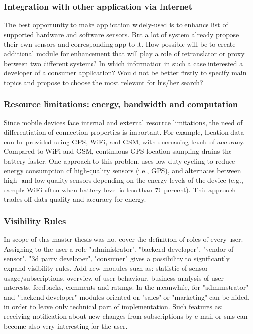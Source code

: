 		\subsubsection {Integration with other application via Internet}
		 The best opportunity to make application widely-used is to enhance list of supported hardware and software sensors. But a lot of system already propose their own sensors and corresponding app to it. How possible will be to create additional module for enhancement that will play a role of retranslator or proxy between two different systems? In which information in such a case interested a developer of a consumer application? Would not be better firstly to specify main topics and propose to choose the most relevant for his/her search?

		\subsubsection {Resource limitations: energy, bandwidth and computation}
		Since mobile devices face internal and external resource limitations, the need of differentiation of connection properties is important. For example, location data can be provided using GPS, WiFi, and GSM, with decreasing levels of accuracy. Compared to WiFi and GSM, continuous GPS location sampling drains the battery faster. One approach to this problem uses low duty cycling to reduce energy consumption of high-quality sensors (i.e., GPS), and alternates between high- and low-quality sensors depending on the energy levels of the device (e.g., sample WiFi often when battery level is less than 70 percent). This approach trades off data quality and accuracy for energy. 

		\subsubsection {Visibility Rules}
		In scope of this master thesis was not cover the definition of roles of every user. Assigning to the user a role "administrator", "backend developer", "vendor of sensor", "3d party developer", "consumer" gives a possibility to significantly expand visibility rules. Add new modules such as: statistic of sensor usage/subscriptions, overview of user behaviour, business analysis of user interests, feedbacks, comments and ratings. In the meanwhile, for "administrator" and "backend developer" modules oriented on "sales" or "marketing" can be hided, in order to leave only technical part of implementation. Such features as: receiving notification about new changes from subscriptions by e-mail or sms can become also very interesting for the user.
